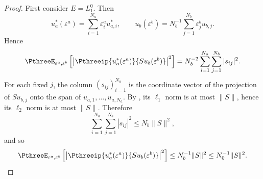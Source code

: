 \documentclass[11pt,reqno]{amsart}
\makeatletter
\theoremstyle{plain}
\theoremstyle{definition}
\newcounter{problempaper}
\newenvironment{problempaperbody}{%
  \setcounter{subsection}{0}%
  \setcounter{subsubsection}{0}%
  \setcounter{paragraph}{0}%
  \renewcommand{\thesubsection}{\arabic{subsection}}%
  \renewcommand{\thesubsubsection}{\thesubsection.\arabic{subsubsection}}%
  \renewcommand{\theparagraph}{\thesubsubsection.\arabic{paragraph}}%
  \let\problem@outersection\section
  \let\problem@outersubsection\subsection
  \let\problem@outersubsubsection\subsubsection
  \let\problem@outerparagraph\paragraph
  \let\section\problem@papersection
  \let\subsection\problem@papersubsection
  \let\subsubsection\problem@papersubsubsection
}{%
  \let\section\problem@outersection
  \let\subsection\problem@outersubsection
  \let\subsubsection\problem@outersubsubsection
  \let\paragraph\problem@outerparagraph
}
\newcommand{\problem@target}[2]{%
  \hypertarget{problem-\theproblempaper-#1-#2}{}%
}
\newcommand{\problem@paperheading}[3]{%
  \par\bigskip
  \problem@target{#1}{#2}%
  \noindent{\large\bfseries #2.\quad #3\par}%
  \nobreak\smallskip
}
\newcommand{\problem@papersubheading}[3]{%
  \par\medskip
  \problem@target{#1}{#2}%
  \noindent{\normalsize\bfseries #2.\quad #3\par}%
  \nobreak\smallskip
}
\newcommand{\problem@papersubsubheading}[3]{%
  \par\smallskip
  \problem@target{#1}{#2}%
  \noindent{\normalsize\itshape #2.\quad #3.\ }%
}
\def\problem@papersection{%
  \@ifstar{\problem@papersectionstar}{\problem@papersectionnostar}%
}
\def\problem@papersectionstar#1{%
  \par\bigskip\noindent{\large\bfseries #1\par}\nobreak\smallskip
}
\def\problem@papersectionnostar#1{%
  \refstepcounter{subsection}%
  \setcounter{subsubsection}{0}%
  \setcounter{paragraph}{0}%
  \problem@paperheading{section}{\thesubsection}{#1}%
  \problem@writecontentsline{section}{\thesubsection}{#1}%
}
\def\problem@papersubsection{%
  \@ifstar{\problem@papersubsectionstar}{\problem@papersubsectionnostar}%
}
\def\problem@papersubsectionstar#1{%
  \par\medskip\noindent{\normalsize\bfseries #1\par}\nobreak\smallskip
}
\def\problem@papersubsectionnostar#1{%
  \refstepcounter{subsubsection}%
  \setcounter{paragraph}{0}%
  \problem@papersubheading{subsection}{\thesubsubsection}{#1}%
  \problem@writecontentsline{subsection}{\thesubsubsection}{#1}%
}
\def\problem@papersubsubsection{%
  \@ifstar{\problem@papersubsubsectionstar}{\problem@papersubsubsectionnostar}%
}
\def\problem@papersubsubsectionstar#1{%
  \par\smallskip\noindent{\normalsize\itshape #1.\ }%
}
\def\problem@papersubsubsectionnostar#1{%
  \refstepcounter{paragraph}%
  \problem@papersubsubheading{subsubsection}{\theparagraph}{#1}%
  \problem@writecontentsline{subsubsection}{\theparagraph}{#1}%
}
\newcommand{\problem@writecontentsline}[3]{%
  \begingroup
  \protected@write\@auxout{}{%
    \string\problemcontentsentry{\theproblempaper}{#1}{#2}{#3}{\thepage}%
  }%
  \endgroup
}
\newcommand{\problemcontentsentry}[5]{%
  \@ifundefined{problemcontents@#1}{%
    \expandafter\gdef\csname problemcontents@#1\endcsname{}%
  }{}%
  \expandafter\g@addto@macro\csname problemcontents@#1\endcsname{%
    \problemcontentsline{#1}{#2}{#3}{#4}{#5}%
  }%
}
\newcommand{\problemcontentslink}[4]{%
  \hyperlink{problem-#1-#2-#3}{#4}%
}
\newcommand{\problemcontentsline}[5]{%
  \ifstrequal{#2}{section}{%
    \par\noindent
    \problemcontentslink{#1}{#2}{#3}{\makebox[2.5em][l]{#3}#4}%
    \nobreak\dotfill
    \problemcontentslink{#1}{#2}{#3}{#5}\par
  }{%
    \ifstrequal{#2}{subsection}{%
      \par\noindent\hspace*{1.5em}%
      \problemcontentslink{#1}{#2}{#3}{\makebox[3.5em][l]{#3}#4}%
      \nobreak\dotfill
      \problemcontentslink{#1}{#2}{#3}{#5}\par
    }{%
      \par\noindent\hspace*{3em}%
      \problemcontentslink{#1}{#2}{#3}{\makebox[4.5em][l]{#3}#4}%
      \nobreak\dotfill
      \problemcontentslink{#1}{#2}{#3}{#5}\par
    }%
  }%
}
\makeatother
\begin{document}
\begin{problempaperbody}
\begin{proof}
First consider $E=L_1^0$. Then
\begin{equation*}
        u_a^*(\varepsilon^a)=\sum_{i=1}^{N_a}\varepsilon_i^a u_{a,i}^*,\qquad u_b(\varepsilon^b)=N_b^{-1}\sum_{j=1}^{N_b}\varepsilon_j^b u_{b,j}.
\end{equation*}
Hence
\begin{equation*}
        \PthreeE_{\varepsilon^a,\varepsilon^b}\left[\left|\Pthreeip{u_a^*(\varepsilon^a)}{S u_b(\varepsilon^b)}\right|^2\right]=N_b^{-2}\sum_{i=1}^{N_a}\sum_{j=1}^{N_b}|s_{ij}|^2.
\end{equation*}
For each fixed $j$, the column $(s_{ij})_{i=1}^{N_a}$ is the coordinate vector of the projection of $S u_{b,j}$ onto the span of $u_{a,1},\ldots,u_{a,N_a}$. By , its $\ell_1$ norm is at most $\|S\|$, hence its $\ell_2$ norm is at most $\|S\|$. Therefore
\begin{equation*}
        \sum_{i=1}^{N_a}\sum_{j=1}^{N_b}|s_{ij}|^2\leq N_b\|S\|^2,
\end{equation*}
and so
\begin{equation*}
        \PthreeE_{\varepsilon^a,\varepsilon^b}\left[\left|\Pthreeip{u_a^*(\varepsilon^a)}{S u_b(\varepsilon^b)}\right|^2\right]\leq N_b^{-1}\|S\|^2\leq N_0^{-1}\|S\|^2.
\end{equation*}


\end{proof}
\end{problempaperbody}
\end{document}
